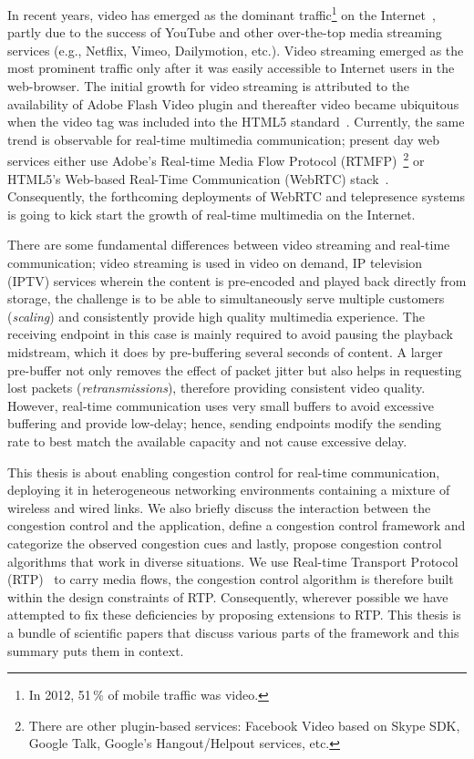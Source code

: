 In recent years, video has emerged as the dominant traffic\footnote{In 2012,
51\,\% of mobile traffic was video.} on the Internet~\cite{cvni.13,dawn.zb},
partly due to the success of YouTube and other over-the-top media streaming
services (e.g., Netflix, Vimeo, Dailymotion, etc.). Video streaming emerged as
the most prominent traffic only after it was easily accessible to Internet
users in the web-browser. The initial growth for video streaming is attributed
to the availability of Adobe Flash Video plugin and thereafter video became
ubiquitous when the video tag was included into the HTML5
standard~\cite{html5-spec}. Currently, the same trend is observable for real-time 
multimedia communication; present day web services either use Adobe's 
Real-time Media Flow Protocol (RTMFP)~\cite{draft.rtmfp}\footnote{There are other 
plugin-based services: Facebook Video based on Skype SDK, Google Talk, Google's
Hangout/Helpout services, etc.} or HTML5's Web-based Real-Time Communication
(WebRTC) stack~\cite{draft.webrtc}. Consequently, the forthcoming deployments
of WebRTC and telepresence systems is going to kick start the growth of 
real-time multimedia on the Internet.


There are some fundamental differences between video streaming and real-time
communication; video streaming is used in video on demand, IP television (IPTV)
services wherein the content is pre-encoded and played back directly from
storage, the challenge is to be able to simultaneously serve multiple
customers (\emph{scaling}) and consistently provide high quality multimedia
experience. The receiving endpoint in this case is mainly required to avoid
pausing the playback midstream, which it does by pre-buffering several seconds
of content. A larger pre-buffer not only removes the effect of packet jitter
but also helps in requesting lost packets (\emph{retransmissions}), therefore
providing consistent video quality. However, real-time communication uses very
small buffers to avoid excessive buffering and provide low-delay; hence,
sending endpoints modify the sending rate to best match the available capacity
and not cause excessive delay.

This thesis is about enabling congestion control for real-time communication,
deploying it in heterogeneous networking environments containing a mixture of
wireless and wired links. We also briefly discuss the interaction between the
congestion control and the application, define a congestion control framework
and categorize the observed congestion cues and lastly, propose congestion
control algorithms that work in diverse situations. We use Real-time Transport
Protocol (RTP)~\cite{rfc3550} to carry media flows, the congestion control
algorithm is therefore built within the design constraints of RTP.
Consequently, wherever possible we have attempted to fix these deficiencies by
proposing extensions to RTP. This thesis is a bundle of scientific papers that
discuss various parts of the framework and this summary puts them in context.

